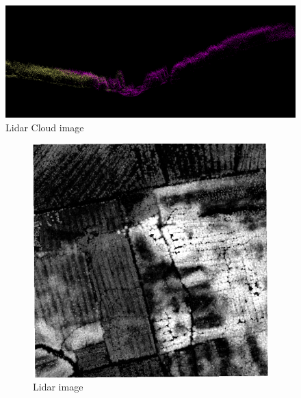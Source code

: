 \documentclass[a4paper,11pt,twoside]{report}
\begin{document}
\begin{figure}[t]
    \centering
 \includegraphics[width=.5\linewidth]{Images/LIDAR_CLOUD.png}
  \caption{Lidar Cloud image}
  \label{fig:LIDAR_CLOUD}
\end{figure}

\begin{figure}[ht]
\centering
\begin{subfigure}{.5\textwidth}
  \centering
 \includegraphics[width=1\linewidth]{Images/CHM.png}
  \caption{Lidar image}
  \label{fig:LIDAR_CLOUD}
\end{subfigure}
\begin{subfigure}{.5\textwidth}
  \centering

\end{subfigure}
\end{figure}
\end{document}
